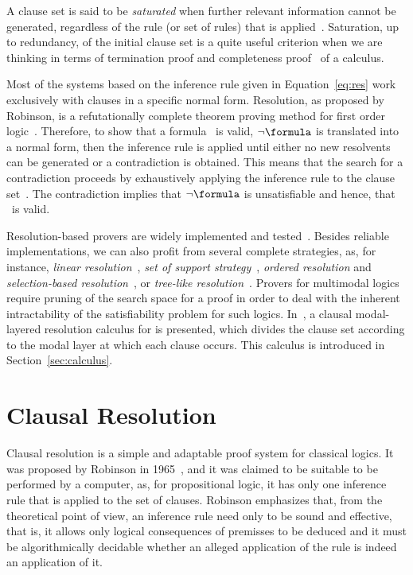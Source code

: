 A clause set is said to be \emph{saturated} when further relevant information cannot be generated, regardless of the rule (or set of rules) that is
applied~\cite{dershowitz2003abstract}. Saturation, up to redundancy, of the
initial clause set is a quite useful criterion when we are thinking in terms of
termination proof and completeness proof~\cite{fitting} of a calculus.

Most of the systems based on the inference rule given in Equation~\ref{eq:res} work exclusively
with clauses in a specific normal form. Resolution, as proposed by Robinson, is
a refutationally complete theorem proving method for first order
logic~\cite{Robinson65}. Therefore, to show that a formula \formula~is valid,
$\neg \formula$ is translated into a normal form, then the inference rule is
applied until either no new resolvents can be generated or a contradiction is
obtained. This means that the search for a contradiction proceeds by
exhaustively applying the inference rule to the clause
set~\cite{bachmair2001resolution}. The contradiction implies that $\neg
\formula$ is unsatisfiable and hence, that \formula~is valid. 

Resolution-based provers are widely implemented and
tested~\cite{bachmair2001resolution}. Besides reliable implementations, we can
also profit from several complete strategies, as, for instance, \emph{linear
resolution}~\cite{casanova}, \emph{set of support
strategy}~\cite{wos1965efficiency}, \emph{ordered resolution} and
\emph{selection-based resolution}~\cite{de2000resolution}, or \emph{tree-like
resolution}~\cite{satchapter}. %
Provers for multimodal logics
require pruning of the search space for a proof in order to deal with the
inherent intractability of the satisfiability problem for such logics.
In~\cite{nalon2015modal}, a clausal modal-layered
resolution calculus for  is presented, which divides the clause set according
to the modal layer at which each clause occurs. This calculus is introduced in
Section~\ref{sec:calculus}.

\section{Clausal Resolution}

Clausal resolution is a simple and adaptable proof system for classical logics.
It was proposed by Robinson in 1965~\cite{Robinson65}, and it was claimed to be
suitable to be performed by a computer, as, for propositional logic, it has only
one inference rule that is applied to the set of clauses. Robinson
emphasizes that, from the theoretical point of view, an inference rule need only
to be sound and effective, that is, it allows only logical consequences of
premisses to be deduced and it must be algorithmically decidable whether an
alleged application of the rule is indeed an application of it.

